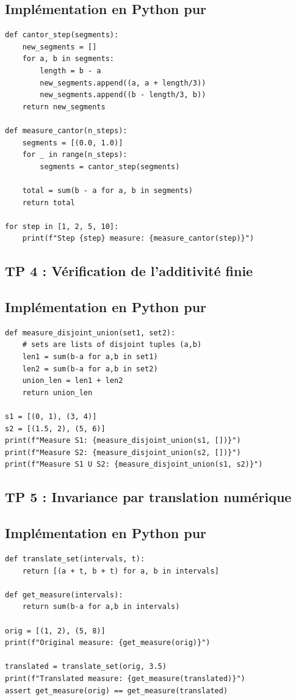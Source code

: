 \documentclass[11pt,a4paper]{article}
\begin{document}
\subsection*{Implémentation en Python pur}

\begin{lstlisting}
def cantor_step(segments):
    new_segments = []
    for a, b in segments:
        length = b - a
        new_segments.append((a, a + length/3))
        new_segments.append((b - length/3, b))
    return new_segments

def measure_cantor(n_steps):
    segments = [(0.0, 1.0)]
    for _ in range(n_steps):
        segments = cantor_step(segments)

    total = sum(b - a for a, b in segments)
    return total

for step in [1, 2, 5, 10]:
    print(f"Step {step} measure: {measure_cantor(step)}")
\end{lstlisting}


\subsection*{TP 4 : Vérification de l'additivité finie}

\subsection*{Implémentation en Python pur}

\begin{lstlisting}
def measure_disjoint_union(set1, set2):
    # sets are lists of disjoint tuples (a,b)
    len1 = sum(b-a for a,b in set1)
    len2 = sum(b-a for a,b in set2)
    union_len = len1 + len2
    return union_len

s1 = [(0, 1), (3, 4)]
s2 = [(1.5, 2), (5, 6)]
print(f"Measure S1: {measure_disjoint_union(s1, [])}")
print(f"Measure S2: {measure_disjoint_union(s2, [])}")
print(f"Measure S1 U S2: {measure_disjoint_union(s1, s2)}")
\end{lstlisting}


\subsection*{TP 5 : Invariance par translation numérique}

\subsection*{Implémentation en Python pur}

\begin{lstlisting}
def translate_set(intervals, t):
    return [(a + t, b + t) for a, b in intervals]

def get_measure(intervals):
    return sum(b-a for a,b in intervals)

orig = [(1, 2), (5, 8)]
print(f"Original measure: {get_measure(orig)}")

translated = translate_set(orig, 3.5)
print(f"Translated measure: {get_measure(translated)}")
assert get_measure(orig) == get_measure(translated)
\end{lstlisting}
\end{document}
